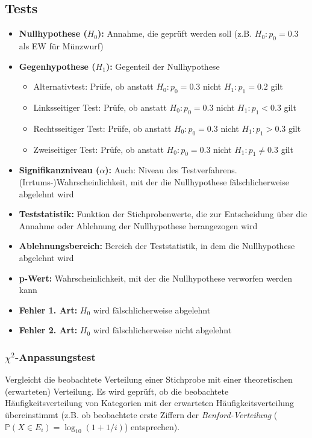 \subsection{Tests}

\begin{itemize}
    \item \textbf{Nullhypothese (\(H_0\)):} Annahme, die geprüft werden soll (z.B. \(H_0: p_0=0.3\) als EW für Münzwurf)
    \item \textbf{Gegenhypothese (\(H_1\)):} Gegenteil der Nullhypothese
        \begin{itemize}
            \item Alternativtest: Prüfe, ob anstatt \(H_0: p_0=0.3\) nicht \(H_1: p_1=0.2\) gilt
            \item Linksseitiger Test: Prüfe, ob anstatt \(H_0: p_0=0.3\) nicht \(H_1: p_1<0.3\) gilt
            \item Rechtsseitiger Test: Prüfe, ob anstatt \(H_0: p_0=0.3\) nicht \(H_1: p_1>0.3\) gilt
            \item Zweiseitiger Test: Prüfe, ob anstatt \(H_0: p_0=0.3\) nicht \(H_1: p_1\neq0.3\) gilt
        \end{itemize}
    \item \textbf{Signifikanzniveau (\(\alpha\)):} Auch: Niveau des Testverfahrens. (Irrtums-)Wahrscheinlichkeit, mit der die Nullhypothese fälschlicherweise abgelehnt wird
    \item \textbf{Teststatistik:} Funktion der Stichprobenwerte, die zur Entscheidung über die Annahme oder Ablehnung der Nullhypothese herangezogen wird
    \item \textbf{Ablehnungsbereich:} Bereich der Teststatistik, in dem die Nullhypothese abgelehnt wird
    \item \textbf{p-Wert:} Wahrscheinlichkeit, mit der die Nullhypothese verworfen werden kann
    \item \textbf{Fehler 1. Art:} \(H_0\) wird fälschlicherweise abgelehnt
    \item \textbf{Fehler 2. Art:} \(H_0\) wird fälschlicherweise nicht abgelehnt
\end{itemize}


\subsubsection{\(\chi^2\)-Anpassungstest}

Vergleicht die beobachtete Verteilung einer Stichprobe mit 
einer theoretischen (erwarteten) Verteilung. Es wird geprüft, 
ob die beobachtete Häufigkeitsverteilung von Kategorien mit der 
erwarteten Häufigkeitsverteilung übereinstimmt (z.B. ob beobachtete erste Ziffern der \emph{Benford-Verteilung} (\(\mathbb{P}(X\in E_i) = \log_{10}(1+1/i)\)) entsprechen).\\

